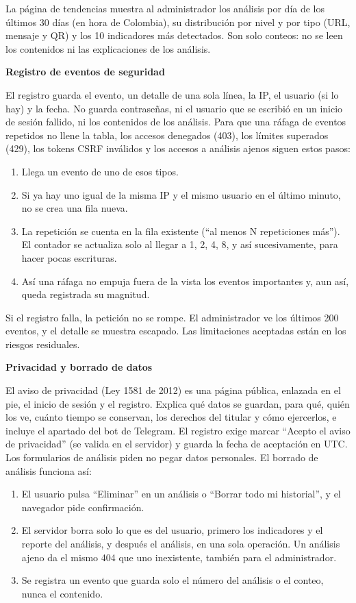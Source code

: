 \documentclass[journal,onecolumn,12pt,draftclsnofoot]{IEEEtran}
\newcommand{\apartado}[1]{\par\medskip\noindent\textbf{#1}\par\smallskip}
\begin{document}
La página de tendencias muestra al administrador los análisis por día de los últimos 30 días (en hora de Colombia), su distribución por nivel y por tipo (URL, mensaje y QR) y los 10 indicadores más detectados. Son solo conteos: no se leen los contenidos ni las explicaciones de los análisis.

\apartado{Registro de eventos de seguridad}

El registro guarda el evento, un detalle de una sola línea, la IP, el usuario (si lo hay) y la fecha. No guarda contraseñas, ni el usuario que se escribió en un inicio de sesión fallido, ni los contenidos de los análisis. Para que una ráfaga de eventos repetidos no llene la tabla, los accesos denegados (403), los límites superados (429), los tokens CSRF inválidos y los accesos a análisis ajenos siguen estos pasos:

\begin{enumerate}
  \item Llega un evento de uno de esos tipos.
  \item Si ya hay uno igual de la misma IP y el mismo usuario en el último minuto, no se crea una fila nueva.
  \item La repetición se cuenta en la fila existente (``al menos N repeticiones más''). El contador se actualiza solo al llegar a 1, 2, 4, 8, y así sucesivamente, para hacer pocas escrituras.
  \item Así una ráfaga no empuja fuera de la vista los eventos importantes y, aun así, queda registrada su magnitud.
\end{enumerate}

Si el registro falla, la petición no se rompe. El administrador ve los últimos 200 eventos, y el detalle se muestra escapado. Las limitaciones aceptadas están en los riesgos residuales.

\apartado{Privacidad y borrado de datos}

El aviso de privacidad (Ley 1581 de 2012) es una página pública, enlazada en el pie, el inicio de sesión y el registro. Explica qué datos se guardan, para qué, quién los ve, cuánto tiempo se conservan, los derechos del titular y cómo ejercerlos, e incluye el apartado del bot de Telegram. El registro exige marcar ``Acepto el aviso de privacidad'' (se valida en el servidor) y guarda la fecha de aceptación en UTC. Los formularios de análisis piden no pegar datos personales. El borrado de análisis funciona así:

\begin{enumerate}
  \item El usuario pulsa ``Eliminar'' en un análisis o ``Borrar todo mi historial'', y el navegador pide confirmación.
  \item El servidor borra solo lo que es del usuario, primero los indicadores y el reporte del análisis, y después el análisis, en una sola operación. Un análisis ajeno da el mismo 404 que uno inexistente, también para el administrador.
  \item Se registra un evento que guarda solo el número del análisis o el conteo, nunca el contenido.
\end{enumerate}
\end{document}
